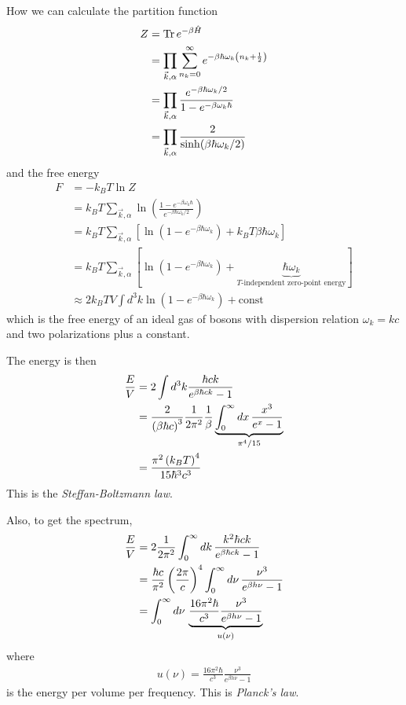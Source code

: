How we can calculate the partition function
\begin{align}
    Z &= \Tr e^{-\beta \hat{H}}\\
    &=
    \prod_{\vec{k},\alpha} \sum_{n_k=0}^{\infty}
    e^{-\beta\hbar\omega_k\left( n_k + \frac{1}{2} \right)}\\
    &= \prod_{\vec{k}, \alpha}
    \frac{e^{-\beta\hbar\omega_k/2}}{1 - e^{-\beta\omega_k\hbar}}\\
    &= \prod_{\vec{k},\alpha} \frac{2}{\sinh(\beta\hbar\omega_k/2)}
\end{align}
and the free energy
\begin{align}
    F &=
    -k_B T \ln Z\\
    &=
    k_B T \sum_{\vec{k}, \alpha} \ln\left( 
    \frac{1 - e^{-\beta \omega_k \hbar}}{e^{-\beta\hbar\omega_k/2}}
    \right)\\
    &=
    k_B T \sum_{\vec{k},\alpha}\left[ 
    \ln\left( 
    1 - e^{-\beta\hbar\omega_k}
    \right)
    +
    k_B T \beta \hbar\omega_k
    \right]\\
    &=
    k_B T \sum_{\vec{k},\alpha}\left[ 
    \ln\left( 
    1 - e^{-\beta\hbar\omega_k}
    \right)
    +
    \underbrace{\hbar\omega_k}_{\textrm{$T$-independent zero-point energy}}
    \right]\\
    &\approx
    2 k_B T V \int d^3k \ln\left( 
    1 - e^{-\beta \hbar\omega_k}
    \right)
    + \textrm{const}
\end{align}
which is the free energy of an ideal gas of bosons with dispersion relation
$\omega_k=kc$ and two polarizations plus a constant.

The energy is then
\begin{align}
    \frac{E}{V} &=
    2 \int d^3 k \frac{\hbar ck}{e^{\beta \hbar c k} - 1}\\
    &=
    \frac{2}{\left( \beta\hbar c \right)^3 }
    \frac{1}{2\pi^2}
    \frac{1}{\beta}
    \underbrace{\int_{0}^{\infty}
    dx\,
    \frac{x^3}{e^{x} - 1}}_{%
    \pi^4/15
    }\\
    &=
    \frac{\pi^2 \left( k_B T \right)^4}{15 \hbar^3 c^3}
\end{align}
This is the \emph{Steffan-Boltzmann law}.

Also, to get the spectrum,
\begin{align}
    \frac{E}{V} &=
    2 \frac{1}{2\pi^2} \int_{0}^{\infty} dk\,
    \frac{k^2 \hbar ck}{e^{\beta\hbar ck} - 1}\\
    &=
    \frac{\hbar c}{\pi^2} \left( \frac{2\pi}{c} \right)^4
    \int_{0}^{\infty} d\nu\,
    \frac{\nu^3}{e^{\beta h\nu} - 1}\\
    &=
    \int_{0}^{\infty} d\nu\,
    \underbrace{%
    \frac{16\pi^2\hbar}{c^3}
    \frac{\nu^3}{e^{\beta h \nu} - 1}}_{%
    u(\nu)
    }
\end{align}
where
\begin{align}
    u(\nu) = 
    \frac{16\pi^2\hbar}{c^3}
    \frac{\nu^3}{e^{\beta h \nu} - 1}
\end{align}
is the energy per volume per frequency.
This is \emph{Planck's law}.
